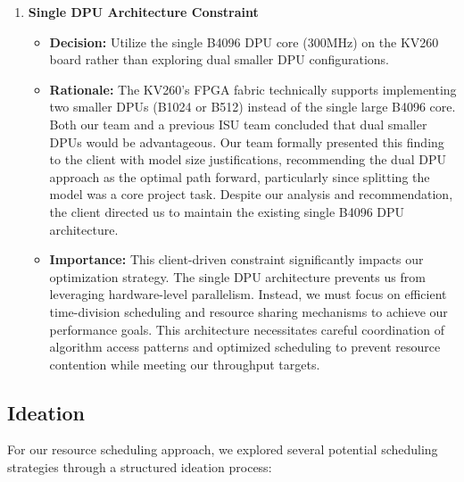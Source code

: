 \begin{enumerate}
\item \textbf{Single DPU Architecture Constraint}
   \begin{itemize}
   \item \textbf{Decision:} Utilize the single B4096 DPU core (300MHz) on the KV260 board rather than exploring dual smaller DPU configurations.
   \item \textbf{Rationale:} The KV260's FPGA fabric technically supports implementing two smaller DPUs (B1024 or B512) instead of the single large B4096 core. Both our team and a previous ISU team concluded that dual smaller DPUs would be advantageous. Our team formally presented this finding to the client with model size justifications, recommending the dual DPU approach as the optimal path forward, particularly since splitting the model was a core project task. Despite our analysis and recommendation, the client directed us to maintain the existing single B4096 DPU architecture.
   \item \textbf{Importance:} This client-driven constraint significantly impacts our optimization strategy. The single DPU architecture prevents us from leveraging hardware-level parallelism. Instead, we must focus on efficient time-division scheduling and resource sharing mechanisms to achieve our performance goals. This architecture necessitates careful coordination of algorithm access patterns and optimized scheduling to prevent resource contention while meeting our throughput targets.
   \end{itemize}
\end{enumerate}

\subsection{Ideation}\label{subsec:ideation}

For our resource scheduling approach, we explored several potential scheduling strategies through a structured ideation process:

